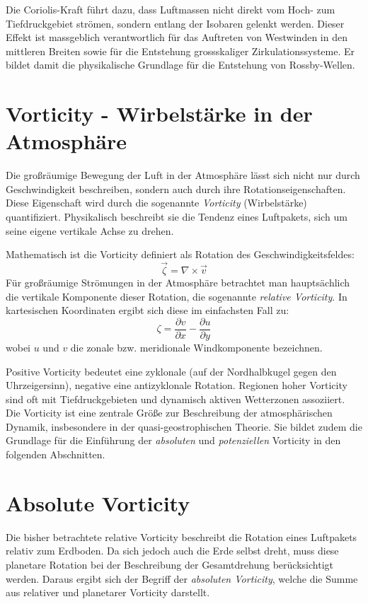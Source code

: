 \begin{refsection}
    Die Coriolis-Kraft führt dazu, dass Luftmassen nicht direkt vom Hoch- zum Tiefdruckgebiet strömen, sondern entlang der Isobaren gelenkt werden.  
    Dieser Effekt ist massgeblich verantwortlich für das Auftreten von Westwinden in den mittleren Breiten sowie für die Entstehung grossskaliger Zirkulationssysteme.  
    Er bildet damit die physikalische Grundlage für die Entstehung von Rossby-Wellen.  
    
    \section{Vorticity - Wirbelstärke in der Atmosphäre}

    Die großräumige Bewegung der Luft in der Atmosphäre lässt sich nicht nur durch Geschwindigkeit beschreiben, sondern auch durch ihre Rotationseigenschaften.  
    Diese Eigenschaft wird durch die sogenannte \emph{Vorticity} (Wirbelstärke) quantifiziert.  
    Physikalisch beschreibt sie die Tendenz eines Luftpakets, sich um seine eigene vertikale Achse zu drehen.  
    
    Mathematisch ist die Vorticity definiert als Rotation des Geschwindigkeitsfeldes:  
    \[
    \vec{\zeta} = \nabla \times \vec{v}
    \]  
    Für großräumige Strömungen in der Atmosphäre betrachtet man hauptsächlich die vertikale Komponente dieser Rotation, die sogenannte \emph{relative Vorticity}.  
    In kartesischen Koordinaten ergibt sich diese im einfachsten Fall zu:
    \[
    \zeta = \frac{\partial v}{\partial x} - \frac{\partial u}{\partial y}
    \]
    wobei \( u \) und \( v \) die zonale bzw. meridionale Windkomponente bezeichnen.  
    
    Positive Vorticity bedeutet eine zyklonale (auf der Nordhalbkugel gegen den Uhrzeigersinn), negative eine antizyklonale Rotation.  
    Regionen hoher Vorticity sind oft mit Tiefdruckgebieten und dynamisch aktiven Wetterzonen assoziiert.  
    Die Vorticity ist eine zentrale Größe zur Beschreibung der atmosphärischen Dynamik, insbesondere in der quasi-geostrophischen Theorie.  
    Sie bildet zudem die Grundlage für die Einführung der \emph{absoluten} und \emph{potenziellen} Vorticity in den folgenden Abschnitten.  
    
    \section{Absolute Vorticity}

    Die bisher betrachtete relative Vorticity beschreibt die Rotation eines Luftpakets relativ zum Erdboden.  
    Da sich jedoch auch die Erde selbst dreht, muss diese planetare Rotation bei der Beschreibung der Gesamtdrehung berücksichtigt werden.  
    Daraus ergibt sich der Begriff der \emph{absoluten Vorticity}, welche die Summe aus relativer und planetarer Vorticity darstellt.  
    

\end{refsection}
